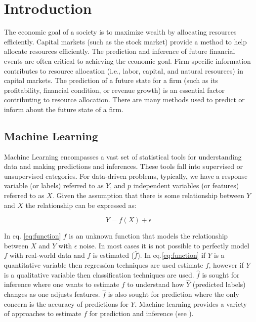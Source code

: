 \chapter{Introduction}


The economic goal of a society is to maximize wealth by allocating resources efficiently. Capital markets (such as the stock market) provide a method to help allocate resources efficiently. The prediction and inference of future financial events are often critical to achieving the economic goal. Firm-specific information contributes to resource allocation (i.e., labor, capital, and natural resources) in capital markets. The prediction of a future state for a firm (such as its profitability, financial condition, or revenue growth) is an essential factor contributing to resource allocation.  There are many methods used to predict or inform about the future state of a firm.  


\section{Machine Learning}

Machine Learning encompasses a vast set of statistical tools for understanding data and making predictions and inferences. These tools fall into supervised or unsupervised categories. For data-driven problems, typically, we have a response variable (or labels)  referred to as \(Y\), and \(p\) independent variables (or features) referred to as \(X\). Given the assumption that there is some relationship between \(Y\) and \(X\) the relationship can be expressed as:

\begin{equation}
\label{eq:function}
Y = f(X) + \epsilon
\end{equation}

\noindent In eq. \ref{eq:function} \(f\) is an unknown function that models the relationship between \(X\) and \(Y\) with  \( \epsilon \) noise.  In most cases it is not possible to perfectly model \(f\) with real-world data and \(f\) is estimated (\(\hat{f}\)). In eq.\ref{eq:function} if \(Y\) is a quantitative variable then regression techniques are used estimate \(f\), however if \(Y\) is a qualitative variable then classification techniques are used.   \(\hat{f}\) is sought for inference where one wants to estimate \(f\) to understand how \(\hat{Y}\) (predicted labels) changes as one adjusts features. \(\hat{f}\) is also sought for prediction where the only concern is the accuracy of predictions for \(Y\). Machine learning provides a variety of approaches to estimate \(f\) for prediction and inference (see \cite{ISL}).

